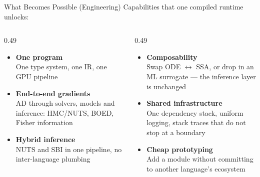 \documentclass[aspectratio=169]{beamer}
\begin{document}
\begin{frame}{What Becomes Possible (Engineering)}
	\small
	Capabilities that one compiled runtime unlocks:
	\smallskip
	\begin{columns}[T]
		\begin{column}{0.49\textwidth}
			\begin{itemize}\itemsep3pt\parskip0pt
				\item \textbf{One program}\\[1pt]
				{\scriptsize One type system, one IR, one GPU pipeline}
				\item \textbf{End-to-end gradients}\\[1pt]
				{\scriptsize AD through solvers, models and inference: HMC/NUTS, BOED, Fisher information}
				\item \textbf{Hybrid inference}\\[1pt]
				{\scriptsize NUTS and SBI in one pipeline, no inter-language plumbing}
			\end{itemize}
		\end{column}
		\begin{column}{0.49\textwidth}
			\begin{itemize}\itemsep3pt\parskip0pt
				\item \textbf{Composability}\\[1pt]
				{\scriptsize Swap ODE $\leftrightarrow$ SSA, or drop in an ML surrogate --- the inference layer is unchanged}
				\item \textbf{Shared infrastructure}\\[1pt]
				{\scriptsize One dependency stack, uniform logging, stack traces that do not stop at a boundary}
				\item \textbf{Cheap prototyping}\\[1pt]
				{\scriptsize Add a module without committing to another language's ecosystem}
			\end{itemize}
		\end{column}
	\end{columns}


\end{frame}
\end{document}
